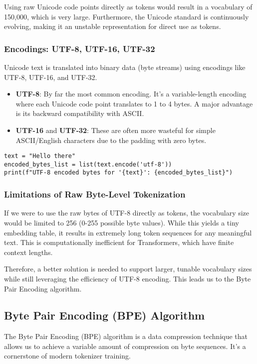 Using raw Unicode code points directly as tokens would result in a vocabulary of 150,000, which is very large. Furthermore, the Unicode standard is continuously evolving, making it an unstable representation for direct use as tokens.

\subsubsection{Encodings: UTF-8, UTF-16, UTF-32}
Unicode text is translated into binary data (byte streams) using encodings like UTF-8, UTF-16, and UTF-32.
\begin{itemize}
    \item \textbf{UTF-8}: By far the most common encoding. It's a variable-length encoding where each Unicode code point translates to 1 to 4 bytes. A major advantage is its backward compatibility with ASCII.
    \item \textbf{UTF-16} and \textbf{UTF-32}: These are often more wasteful for simple ASCII/English characters due to the padding with zero bytes.
\end{itemize}

\begin{lstlisting}[caption={Encoding a string to bytes using UTF-8}]
text = "Hello there"
encoded_bytes_list = list(text.encode('utf-8'))
print(f"UTF-8 encoded bytes for '{text}': {encoded_bytes_list}")
\end{lstlisting}

\subsubsection{Limitations of Raw Byte-Level Tokenization}
If we were to use the raw bytes of UTF-8 directly as tokens, the vocabulary size would be limited to 256 (0-255 possible byte values). While this yields a tiny embedding table, it results in extremely long token sequences for any meaningful text. This is computationally inefficient for Transformers, which have finite context lengths.

Therefore, a better solution is needed to support larger, tunable vocabulary sizes while still leveraging the efficiency of UTF-8 encoding. This leads us to the Byte Pair Encoding algorithm.

\subsection{Byte Pair Encoding (BPE) Algorithm}

The Byte Pair Encoding (BPE) algorithm is a data compression technique that allows us to achieve a variable amount of compression on byte sequences. It's a cornerstone of modern tokenizer training.

